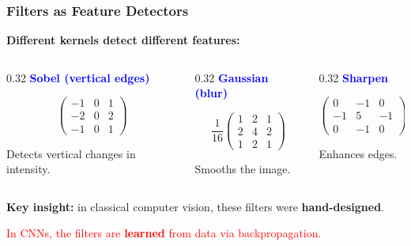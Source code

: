 \documentclass[notes,11pt, aspectratio=169]{beamer}
\begin{document}
\begin{frame}
\frametitle{Filters as Feature Detectors}

\textbf{Different kernels detect different features:}

\vspace{6pt}
\begin{columns}[T]
\begin{column}{0.32\textwidth}
\centering
\textcolor{blue}{\textbf{Sobel (vertical edges)}}

\[
    \begin{pmatrix} -1 & 0 & 1 \\ -2 & 0 & 2 \\ -1 & 0 & 1 \end{pmatrix}
\]

\vspace{2pt}
{\scriptsize Detects vertical changes in intensity.}
\end{column}

\begin{column}{0.32\textwidth}
\centering
\textcolor{blue}{\textbf{Gaussian (blur)}}

\[
    \frac{1}{16}\begin{pmatrix} 1 & 2 & 1 \\ 2 & 4 & 2 \\ 1 & 2 & 1 \end{pmatrix}
\]

\vspace{2pt}
{\scriptsize Smooths the image.}
\end{column}

\begin{column}{0.32\textwidth}
\centering
\textcolor{blue}{\textbf{Sharpen}}

\[
    \begin{pmatrix} 0 & -1 & 0 \\ -1 & 5 & -1 \\ 0 & -1 & 0 \end{pmatrix}
\]

\vspace{2pt}
{\scriptsize Enhances edges.}
\end{column}
\end{columns}

\vspace{12pt}
\textbf{Key insight:} in classical computer vision, these filters were \textbf{hand-designed}.

\vspace{4pt}
\begin{center}
\textcolor{red}{In CNNs, the filters are \textbf{learned} from data via backpropagation.}
\end{center}
\end{frame}
\end{document}
